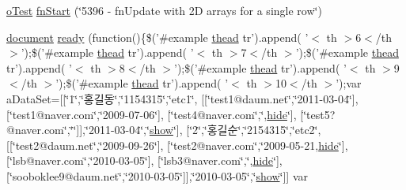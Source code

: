\begin{DoxyCompactItemize}
\item 
\hyperlink{unit__test_8js_a3b2d259e2df3b6860d9047a92d09d0d6}{o\+Test} \hyperlink{5396-fn_update-arrays_8js_a37e375a447ea6f3086d4aaff03f3450a}{fn\+Start} (\char`\"{}5396 -\/ fn\+Update with 2\+D arrays for a single row\char`\"{})
\item 
\hyperlink{outside_events_8js_aa14f8e0338cced6720590fd2ea13bd4b}{document} \hyperlink{5396-fn_update-arrays_8js_ae7b17698194bdfa7c1d83d34ab12c4b8}{ready} (function()\{\$('\#example \hyperlink{core_8constructor_8js_a856be760b6816c9591ce69f0a2b43693}{thead} tr').append( '$<$ th $>$6$<$/th $>$');\$('\#example \hyperlink{core_8constructor_8js_a856be760b6816c9591ce69f0a2b43693}{thead} tr').append( '$<$ th $>$7$<$/th $>$');\$('\#example \hyperlink{core_8constructor_8js_a856be760b6816c9591ce69f0a2b43693}{thead} tr').append( '$<$ th $>$8$<$/th $>$');\$('\#example \hyperlink{core_8constructor_8js_a856be760b6816c9591ce69f0a2b43693}{thead} tr').append( '$<$ th $>$9$<$/th $>$');\$('\#example \hyperlink{core_8constructor_8js_a856be760b6816c9591ce69f0a2b43693}{thead} tr').append( '$<$ th $>$10$<$/th $>$');var a\+Data\+Set=\mbox{[}\mbox{[}\char`\"{}1\char`\"{},\char`\"{}홍길동\char`\"{},\char`\"{}1154315\char`\"{},\char`\"{}etc1\char`\"{}, \mbox{[}\mbox{[}\char`\"{}test1@daum.\+net\char`\"{},\char`\"{}2011-\/03-\/04\char`\"{}\mbox{]}, \mbox{[}\char`\"{}test1@naver.\+com\char`\"{},\char`\"{}2009-\/07-\/06\char`\"{}\mbox{]}, \mbox{[}\char`\"{}test4@naver.\+com\char`\"{},\char`\"{},\hyperlink{jquery_8tooltip_8js_af74dd80504a76d14389d6c8c02f3aa0e}{hide}\char`\"{}\mbox{]}, \mbox{[}\char`\"{}test5?@naver.\+com\char`\"{},\char`\"{}\char`\"{}\mbox{]}\mbox{]},\char`\"{}2011-\/03-\/04\char`\"{},\char`\"{}\hyperlink{jquery_8tooltip_8js_aa8d9f2083cafa2af98efafed94901079}{show}\char`\"{}\mbox{]}, \mbox{[}\char`\"{}2\char`\"{},\char`\"{}홍길순\char`\"{},\char`\"{}2154315\char`\"{},\char`\"{}etc2\char`\"{}, \mbox{[}\mbox{[}\char`\"{}test2@daum.\+net\char`\"{},\char`\"{}2009-\/09-\/26\char`\"{}\mbox{]}, \mbox{[}\char`\"{}test2@naver.\+com\char`\"{},\char`\"{}2009-\/05-\/21,\hyperlink{jquery_8tooltip_8js_af74dd80504a76d14389d6c8c02f3aa0e}{hide}\char`\"{}\mbox{]}, \mbox{[}\char`\"{}lsb@naver.\+com\char`\"{},\char`\"{}2010-\/03-\/05\char`\"{}\mbox{]}, \mbox{[}\char`\"{}lsb3@naver.\+com\char`\"{},\char`\"{},\hyperlink{jquery_8tooltip_8js_af74dd80504a76d14389d6c8c02f3aa0e}{hide}\char`\"{}\mbox{]}, \mbox{[}\char`\"{}sooboklee9@daum.\+net\char`\"{},\char`\"{}2010-\/03-\/05\char`\"{}\mbox{]}\mbox{]},\char`\"{}2010-\/03-\/05\char`\"{},\char`\"{}\hyperlink{jquery_8tooltip_8js_aa8d9f2083cafa2af98efafed94901079}{show}\char`\"{}\mbox{]}\mbox{]} var 
\end{DoxyCompactItemize}
